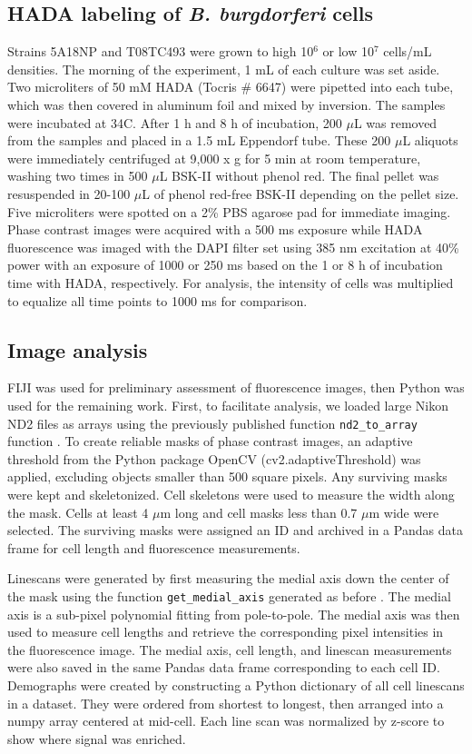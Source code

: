 \documentclass[twoside, watermark]{zHenriquesLab-StyleBioRxiv}
\newcommand{\tmu}{$\mu$} %
\begin{document}
\subsection*{HADA labeling of \textit{B. burgdorferi} cells}
Strains 5A18NP and T08TC493 were grown to high 10$^\text{6}$ or low 10$^\text{7}$ cells/mL densities. The morning of the experiment, 1 mL of each culture was set aside. Two microliters of 50 mM HADA (Tocris \# 6647) were pipetted into each tube, which was then covered in aluminum foil and mixed by inversion. The samples were incubated at 34\degree C. After 1 h and 8 h of incubation, 200 \tmu L was removed from the samples and placed in a 1.5 mL Eppendorf tube. These 200 \tmu L aliquots were immediately centrifuged at 9,000 x g for 5 min at room temperature, washing two times in 500 \tmu L BSK-II without phenol red. The final pellet was resuspended in 20-100 \tmu L of phenol red-free BSK-II depending on the pellet size. Five microliters were spotted on a 2\% PBS agarose pad for immediate imaging. Phase contrast images were acquired with a 500 ms exposure while HADA fluorescence was imaged with the DAPI filter set using 385 nm excitation at 40\% power with an exposure of 1000 or 250 ms based on the 1 or 8 h of incubation time with HADA, respectively. For analysis, the intensity of cells was multiplied to equalize all time points to 1000 ms for comparison.

\subsection*{Image analysis}
FIJI \cite{Schindelin2012} was used for preliminary assessment of fluorescence images, then Python was used for the remaining work. First, to facilitate analysis, we loaded large Nikon ND2 files as arrays using the previously published function \texttt{nd2\_to\_array} function \cite{Makela2024}. To create reliable masks of phase contrast images, an adaptive threshold from the Python package OpenCV (cv2.adaptiveThreshold) was applied, excluding objects smaller than 500 square pixels. Any surviving masks were kept and skeletonized. Cell skeletons were used to measure the width along the mask. Cells at least 4 \tmu m long and cell masks less than 0.7 \tmu m wide were selected. The surviving masks were assigned an ID and archived in a Pandas data frame for cell length and fluorescence measurements.

\vspace{1mm}
Linescans were generated by first measuring the medial axis down the center of the mask using the function \texttt{get\_medial\_axis} generated as before \cite{Papagiannakis2024}. The medial axis is a sub-pixel polynomial fitting from pole-to-pole. The medial axis was then used to measure cell lengths and retrieve the corresponding pixel intensities in the fluorescence image. The medial axis, cell length, and linescan measurements were also saved in the same Pandas data frame corresponding to each cell ID. Demographs were created by constructing a Python dictionary of all cell linescans in a dataset. They were ordered from shortest to longest, then arranged into a numpy array centered at mid-cell. Each line scan was normalized by z-score to show where signal was enriched.
\end{document}
